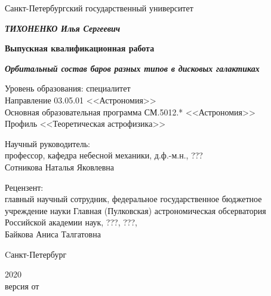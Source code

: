 \begin{titlepage}
  \centering
  {Санкт-Петербургский государственный университет \par}
  
  \vspace{1.5cm}

  {\bfseries \itshape\MakeUppercase{Тихоненко} Илья Сергеевич\par}
  \vspace{0.5\baselineskip}
  {\bfseries Выпускная квалификационная работа\par}
  \vspace{0.5\baselineskip}
  {\bfseries \itshape Орбитальный состав баров разных типов в дисковых галактиках\par}
  \vspace{1cm}
  {
    Уровень образования: специалитет\\
    Направление 03.05.01 <<Астрономия>>\\
    Основная образовательная программа СМ.5012.* <<Астрономия>>\\
    Профиль <<Теоретическая астрофизика>>
  }
  \vspace{1cm}
  \begin{flushright}
    \parbox{0.5\textwidth}{
      {Научный руководитель:} \\
      профессор, кафедра небесной механики, д.ф.-м.н., ???\\
      Сотникова Наталья Яковлевна
    }
  \end{flushright}
  \par
  \begin{flushright}
    \parbox{0.5\textwidth}{
    {Рецензент:} \\
      главный научный сотрудник,
      федеральное государственное бюджетное учреждение науки Главная (Пулковская) 
      астрономическая обсерватория Российской академии наук,
      ???, ???,\\
      Байкова Аниса Талгатовна
    }
  \end{flushright}
  
  \vfill
  
  {Cанкт-Петербург \par}
  {2020}\\
  {\small версия от }
  \vspace*{-\baselineskip}
\end{titlepage}

